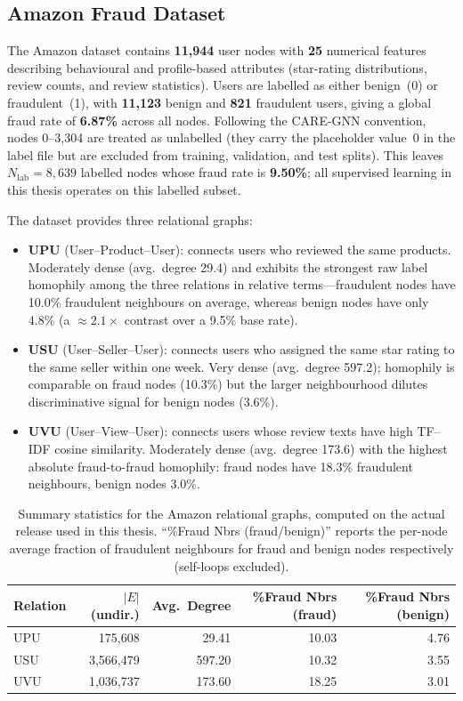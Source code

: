 \subsection{Amazon Fraud Dataset}

The Amazon dataset contains \textbf{11{,}944} user nodes with \textbf{25} numerical features describing behavioural and profile-based attributes (star-rating distributions, review counts, and review statistics). Users are labelled as either benign~(0) or fraudulent~(1), with \textbf{11{,}123} benign and \textbf{821} fraudulent users, giving a global fraud rate of \textbf{6.87\%} across all nodes. Following the CARE-GNN convention, nodes 0--3{,}304 are treated as unlabelled (they carry the placeholder value~0 in the label file but are excluded from training, validation, and test splits). This leaves $N_{\text{lab}}=8{,}639$ labelled nodes whose fraud rate is \textbf{9.50\%}; all supervised learning in this thesis operates on this labelled subset.

The dataset provides three relational graphs:

\begin{itemize}
    \item \textbf{UPU} (User--Product--User): connects users who reviewed the same products. Moderately dense (avg.\ degree 29.4) and exhibits the strongest raw label homophily among the three relations in relative terms---fraudulent nodes have 10.0\% fraudulent neighbours on average, whereas benign nodes have only 4.8\% (a $\approx 2.1\times$ contrast over a 9.5\% base rate).
    \item \textbf{USU} (User--Seller--User): connects users who assigned the same star rating to the same seller within one week. Very dense (avg.\ degree 597.2); homophily is comparable on fraud nodes (10.3\%) but the larger neighbourhood dilutes discriminative signal for benign nodes (3.6\%).
    \item \textbf{UVU} (User--View--User): connects users whose review texts have high TF--IDF cosine similarity. Moderately dense (avg.\ degree 173.6) with the highest absolute fraud-to-fraud homophily: fraud nodes have 18.3\% fraudulent neighbours, benign nodes 3.0\%.
\end{itemize}

\begin{table}[h!]
\centering
\begin{tabular}{lrrrr}
\hline
Relation & $|E|$ (undir.) & Avg.\ Degree & \%Fraud Nbrs (fraud) & \%Fraud Nbrs (benign) \\
\hline
UPU & 175{,}608     & 29.41  & 10.03 & 4.76 \\
USU & 3{,}566{,}479 & 597.20 & 10.32 & 3.55 \\
UVU & 1{,}036{,}737 & 173.60 & 18.25 & 3.01 \\
\hline
\end{tabular}
\caption{Summary statistics for the Amazon relational graphs, computed on the actual release used in this thesis. ``\%Fraud Nbrs (fraud/benign)'' reports the per-node average fraction of fraudulent neighbours for fraud and benign nodes respectively (self-loops excluded).}
\label{tab:amazon-stats}
\end{table}

